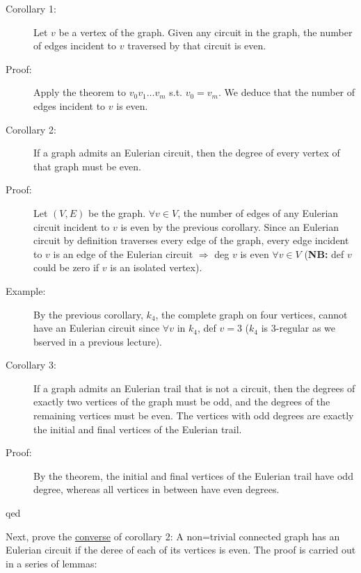 \documentclass[10pt]{article}
\begin{document}
\begin{description}
		\item[Corollary 1:] Let $v$ be a vertex of the graph. Given any circuit in the graph, the number of edges incident to $v$ traversed by that circuit is even.
		\item[Proof:] Apply the theorem to $v_0 v_1 \dots v_m$ s.t. $v_0 = v_m$. We deduce that the number of edges incident to $v$ is even.
		\item[Corollary 2:] If a graph admits an Eulerian circuit, then the degree of every vertex of that graph must be even.
		\item[Proof:] Let $(V, E)$ be the graph. $\forall v \in V$, the number of edges of any Eulerian circuit incident to $v$ is even by the previous corollary. Since an Eulerian circuit by definition traverses every edge of the graph, every edge incident to $v$ is an edge of the Eulerian circuit $\Rightarrow$ deg $v$ is even $\forall v \in V$ (\textbf{NB:} def $v$ could be zero if $v$ is an isolated vertex).
		\item[Example:] By the previous corollary, $k_4$, the complete graph on four vertices, cannot have an Eulerian circuit since $\forall v$ in $k_4$, def $v = 3$ ($k_4$ is 3-regular as we bserved in a previous lecture).
		\item[Corollary 3:] If a graph admits an Eulerian trail that is not a circuit, then the degrees of exactly two vertices of the graph must be odd, and the degrees of the remaining vertices must be even. The vertices with odd degrees are exactly the initial and final vertices of the Eulerian trail.
		\item[Proof:] By the theorem, the initial and final vertices of the Eulerian trail have odd degree, whereas all vertices in between have even degrees.
		\item[qed] 
	\end{description}
	Next, prove the \underline{converse} of corollary 2: A non=trivial connected graph has an Eulerian circuit if the deree of each of its vertices is even. The proof is carried out in a series of lemmas:
\end{document}
